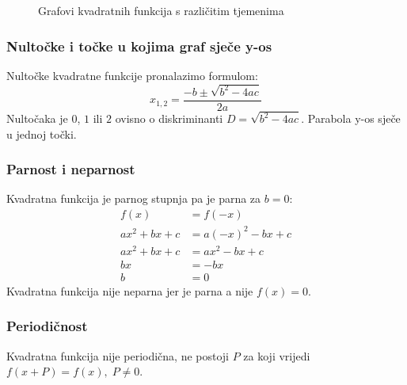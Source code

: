     \begin{figure}[ht]
        \centering
        \caption{Grafovi kvadratnih funkcija s različitim tjemenima}
        \label{fig:template}
    \end{figure}
    

\subsubsection{Nultočke i točke u kojima graf sječe y-os \kvad}
    Nultočke kvadratne funkcije pronalazimo formulom:
    \[x_{1, 2} = \frac{-b \pm \sqrt{b^2 - 4ac}}{2a}\]
    Nultočaka je \(0\), \(1\) ili \(2\) ovisno o diskriminanti \(D = \sqrt{b^2 - 4ac}\).
    Parabola y-os sječe u jednoj točki.

\subsubsection{Parnost i neparnost \kvad}
    Kvadratna funkcija je parnog stupnja pa je parna za \(b = 0\):
    \begin{equation*}
        \begin{split}
            f(x)            &= f(-x) \\
            ax^2 + bx + c   &= a(-x)^2 - bx + c \\
            ax^2 + bx + c   &= ax^2 - bx + c \\
            bx              &= - bx \\
            b               &= 0 
        \end{split}
    \end{equation*}
    Kvadratna funkcija nije neparna jer je parna a nije \(f(x) = 0\).
\subsubsection{Periodičnost \kvad}
    Kvadratna funkcija nije periodična, ne postoji \(P\) za koji vrijedi \(f(x + P) = f(x),\; P \neq 0\).

